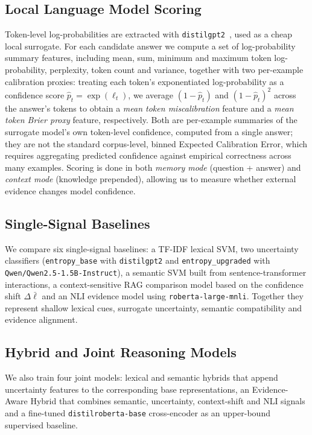 \documentclass[conference]{IEEEtran}
\begin{document}
\subsection{Local Language Model Scoring}

Token-level log-probabilities are extracted with \texttt{distilgpt2}~\cite{radford2019gpt2}, used as a cheap local surrogate. For each candidate answer we compute a set of log-probability summary features, including mean, sum, minimum and maximum token log-probability, perplexity, token count and variance, together with two per-example calibration proxies: treating each token's exponentiated log-probability as a confidence score $\hat{p}_t = \exp(\ell_t)$, we average $(1-\hat{p}_t)$ and $(1-\hat{p}_t)^2$ across the answer's tokens to obtain a \emph{mean token miscalibration} feature and a \emph{mean token Brier proxy} feature, respectively. Both are per-example summaries of the surrogate model's own token-level confidence, computed from a single answer; they are not the standard corpus-level, binned Expected Calibration Error, which requires aggregating predicted confidence against empirical correctness across many examples. Scoring is done in both \emph{memory mode} (question + answer) and \emph{context mode} (knowledge prepended), allowing us to measure whether external evidence changes model confidence.

\subsection{Single-Signal Baselines}

We compare six single-signal baselines: a TF-IDF lexical SVM, two uncertainty classifiers (\texttt{entropy\_base} with \texttt{distilgpt2} and \texttt{entropy\_upgraded} with \texttt{Qwen/Qwen2.5-1.5B-Instruct}), a semantic SVM built from sentence-transformer interactions, a context-sensitive RAG comparison model based on the confidence shift $\Delta\bar{\ell}$ and an NLI evidence model using \texttt{roberta-large-mnli}. Together they represent shallow lexical cues, surrogate uncertainty, semantic compatibility and evidence alignment.

\subsection{Hybrid and Joint Reasoning Models}

We also train four joint models: lexical and semantic hybrids that append uncertainty features to the corresponding base representations, an Evidence-Aware Hybrid that combines semantic, uncertainty, context-shift and NLI signals and a fine-tuned \texttt{distilroberta-base} cross-encoder as an upper-bound supervised baseline.
\end{document}
